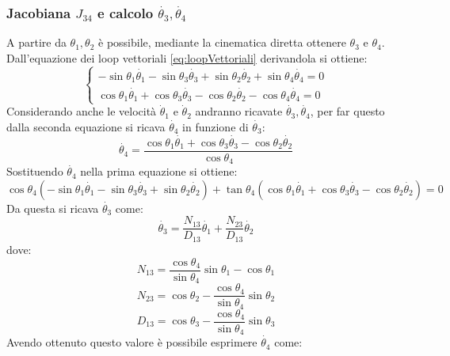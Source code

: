 \subsubsection{Jacobiana $J_{34}$ e calcolo $\dot{\theta_3},\dot{\theta_4}$}
A partire da $\theta_1, \theta_2$ è possibile, mediante la cinematica diretta ottenere $\theta_3$ e $\theta_4$. Dall'equazione dei loop vettoriali \ref{eq:loopVettoriali} derivandola si ottiene: 
\begin{equation}
	\begin{cases}
		-\sin\theta_1 \dot{\theta_1} -\sin\theta_3\dot{\theta_3}+\sin\theta_2\dot{\theta_2}+\sin\theta_4\dot{\theta_4} = 0
		\\ \cos\theta_1\dot{\theta_1} + \cos\theta_3\dot{\theta_3}-\cos\theta_2\dot{\theta_2}-\cos\theta_4\dot{\theta_4} = 0
	\end{cases}
\end{equation}
Considerando anche le velocità $\dot{\theta}_1$ e $\dot{\theta}_2$ andranno ricavate $\dot{\theta_3}, \dot{\theta_4}$, per far questo dalla seconda equazione si ricava $\dot{\theta_4}$ in funzione di $\dot{\theta_3}$:
\begin{equation*}
	\dot{\theta_4} = \frac{\cos\theta_1\dot{\theta_1} + \cos\theta_3\dot{\theta_3}-\cos\theta_2\dot{\theta_2}}{\cos\theta_4}
\end{equation*}
Sostituendo $\dot{\theta_4}$ nella prima equazione si ottiene:
\begin{equation*}
	\cos\theta_4(-\sin\theta_1\dot{\theta_1}-\sin\theta_3\dot{\theta_3}+\sin\theta_2\dot{\theta_2})+\tan\theta_4(\cos\theta_1\dot{\theta_1}+\cos\theta_3\dot{\theta_3}-\cos\theta_2\dot{\theta_2}) = 0
\end{equation*}
Da questa si ricava $\dot{\theta_3}$ come:
\begin{equation}
	\dot{\theta_3} = \frac{N_{13}}{D_{13}}\dot{\theta_1}+\frac{N_{23}}{D_{13}}\dot{\theta_2}
\end{equation}
dove:
\begin{equation*}
    N_{13} = \frac{\cos\theta_4}{\sin\theta_4}\sin\theta_1-\cos\theta_1
\end{equation*}
\begin{equation*}
    N_{23} = \cos\theta_2-\frac{\cos\theta_4}{\sin\theta_4}\sin\theta_2
\end{equation*}
\begin{equation*}
    D_{13} = \cos\theta_3-\frac{\cos\theta_4}{\sin\theta_4}\sin\theta_3
\end{equation*}
Avendo ottenuto questo valore è possibile esprimere $\dot{\theta_4}$ come:
